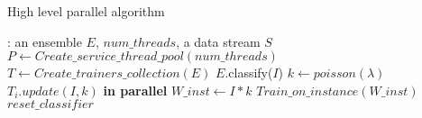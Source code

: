 


\begin{algorithm}
  \caption{High level parallel algorithm}
  \label{alg:highlevel-new}
  \begin{algorithmic}[1]
    : an ensemble $E$, $num\_threads$, a data stream $S$
    \State $P \gets Create\_service\_thread\_pool(num\_threads)$
    \State $T \gets Create\_trainers\_collection(E)$
    \State $E$.classify($I$)
    \State $k \gets poisson(\lambda)$
    \State $T_i.update(I, k)$
    \EndFor
     {\bf in parallel}
    \State $W\_inst \gets I * k$
    \State $Train\_on\_instance(W\_inst)$
    \EndFor
    \State $reset\_classifier$
    \EndIf
    \EndFor
  \end{algorithmic}
\end{algorithm}